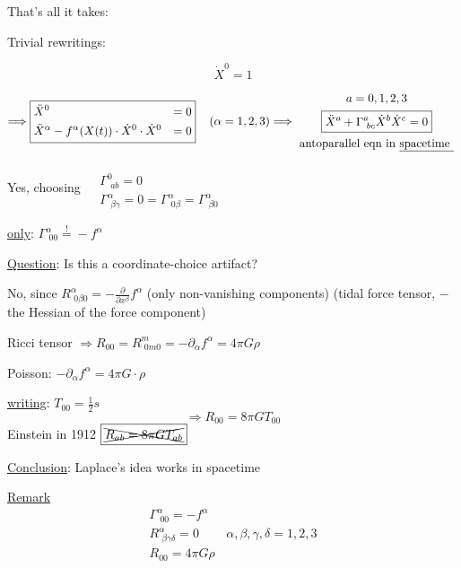 \documentclass[10pt]{amsart}
\begin{document}
\begin{multicols*}{2}
	That's all it takes:
	
	Trivial rewritings:
	
	\[
	\dot{X}^0 =1
	\]
	
	\[
	\Longrightarrow \boxed{ \begin{aligned}
		& \ddot{X}^0 & = 0 \\ 
		& \ddot{X}^{\alpha} - f^{\alpha}(X(t))\cdot \dot{X}^0 \cdot \dot{X}^0 & =0 
		\end{aligned} } \quad \, (\alpha = 1,2,3)  \Longrightarrow \begin{gathered}
	a = 0,1,2,3 \\
	\boxed{ \ddot{X}^a + \Gamma^a_{ \, \, bc}\dot{X}^b \dot{X}^c = 0 } \\
	\text{ antoparallel eqn in \underline{spacetime } }
	\end{gathered}
	\]
	
	Yes, choosing $\begin{aligned} & \quad \\
	& \Gamma^0_{ \, \, ab} = 0 \\
	& \Gamma^{\alpha}_{ \, \, \beta \gamma} = 0 =\Gamma^{\alpha}_{\,\, 0\beta} = \Gamma^{\alpha}_{ \, \, \beta 0}\end{aligned}$
	
	\underline{only}: $\boxed{ \Gamma^{\alpha}_{ \, \, 00} \overset{!}{=} -f^{\alpha}}$
	
	\underline{Question}: Is this a coordinate-choice artifact?
	
	No, since $R^{\alpha}_{ \, \, 0\beta 0} = - \frac{ \partial }{ \partial x^{\beta}} f^{\alpha}$ (only non-vanishing components) (tidal force tensor, $-$ the Hessian of the force component)
	
	Ricci tensor $\Longrightarrow  R_{00} = R^m_{ \, \, 0m0} = -\partial_{\alpha} f^{\alpha} = 4\pi G \rho$
	
	Poisson: $-\partial_{\alpha}f^{\alpha} = 4\pi G\cdot \rho$
	
	\underline{writing}: $T_{00} = \frac{1}{2}s$ 
	\[
	\Longrightarrow \boxed{ R_{00} = 8 \pi G T_{00} }
	\]
	Einstein in 1912 $ \boxed{ \xcancel{ R_{ab} = 8\pi G T_{ab} }}$
	
	
	\underline{Conclusion}: Laplace's idea works in spacetime
	
	\underline{Remark} 
	\[
	\begin{gathered}
	\Gamma^{\alpha}_{ \, \, 00 } = -f^{\alpha} \\ 
	R^{\alpha}_{ \, \, \beta \gamma \delta } = 0 \quad \quad \, \alpha, \beta , \gamma, \delta = 1,2,3 \\
	\boxed{ R_{00} = 4\pi G \rho }
	\end{gathered}
	\]
	

\end{multicols*}
\end{document}
